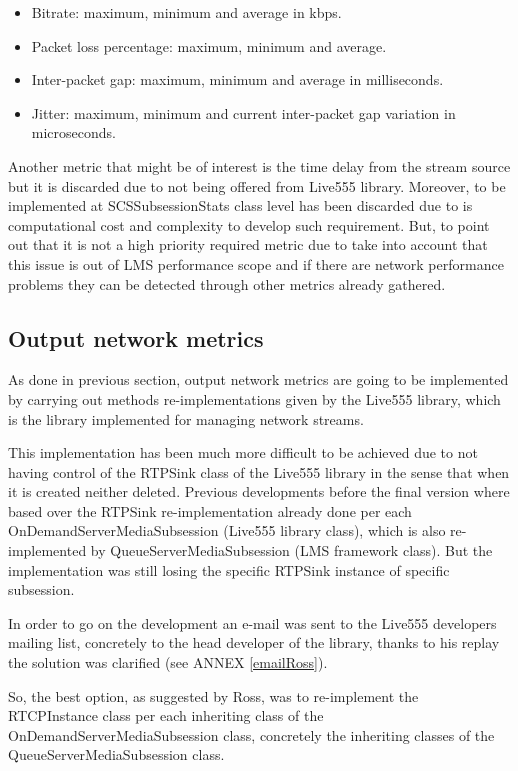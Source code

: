\begin{itemize}
\item Bitrate: maximum, minimum and average in kbps.
\item Packet loss percentage: maximum, minimum and average.
\item Inter-packet gap: maximum, minimum and average in milliseconds.
\item Jitter: maximum, minimum and current inter-packet gap variation in microseconds.
\end{itemize}

Another metric that might be of interest is the time delay from the stream source but it is discarded due to not being offered from Live555 library. Moreover, to be implemented at SCSSubsessionStats class level has been discarded due to is computational cost and complexity to develop such requirement. But, to point out that it is not a high priority required metric due to take into account that this issue is out of LMS performance scope and if there are network performance problems they can be detected through other metrics already gathered.


\subsection{Output network metrics}

As done in previous section, output network metrics are going to be implemented by carrying out methods re-implementations given by the Live555 library, which is the library implemented for managing network streams.

This implementation has been much more difficult to be achieved due to not having control of the RTPSink class of the Live555 library in the sense that when it is created neither deleted. Previous developments before the final version where based over the RTPSink re-implementation already done per each OnDemandServerMediaSubsession (Live555 library class), which is also re-implemented by QueueServerMediaSubsession (LMS framework class). But the implementation was still losing the specific RTPSink instance of specific subsession.

In order to go on the development an e-mail was sent to the Live555 developers mailing list, concretely to the head developer of the library, thanks to his replay the solution was clarified (see ANNEX \ref{emailRoss}).

So, the best option, as suggested by Ross, was to re-implement the RTCPInstance class per each inheriting class of the OnDemandServerMediaSubsession class, concretely the inheriting classes of the QueueServerMediaSubsession class. 

